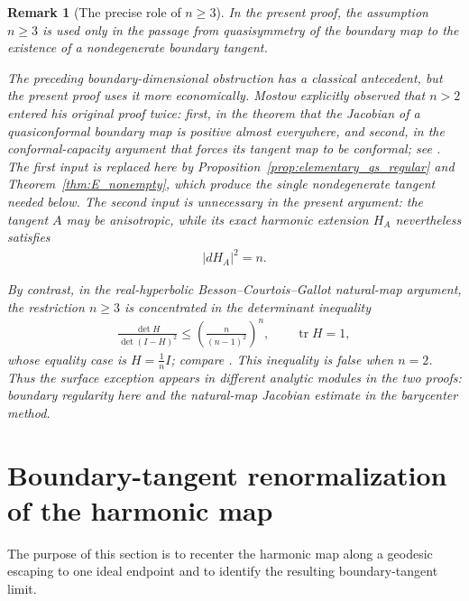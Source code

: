 \documentclass[11pt]{amsart}
\theoremstyle{plain}
\theoremstyle{plain}
\theoremstyle{plain}
\newtheorem{remark}[theorem]{Remark}
\numberwithin{equation}{section}
\begin{document}
\begin{remark}[The precise role of \(n\geq3\)]
In the present proof, the assumption \(n\geq3\) is used only in the
passage from quasisymmetry of the boundary map to the existence of a
nondegenerate boundary tangent.

The preceding boundary-dimensional obstruction has a classical
antecedent, but the present proof uses it more economically.  Mostow
explicitly observed that \(n>2\) entered his original proof twice:
first, in the theorem that the Jacobian of a quasiconformal boundary
map is positive almost everywhere, and second, in the
conformal-capacity argument that forces its tangent map to be
conformal; see
\cite[Theorem~9.4 and \S12, pp.~94, 99--102]{Mostow1968}.
The first input is replaced here by
Proposition~\ref{prop:elementary_qs_regular} and
Theorem~\ref{thm:E_nonempty}, which produce the single nondegenerate
tangent needed below.  The second input is unnecessary in the present
argument: the tangent \(A\) may be anisotropic, while its exact
harmonic extension \(H_A\) nevertheless satisfies
\begin{align}
|dH_A|^2=n.
\nonumber
\end{align}

By contrast, in the real-hyperbolic Besson--Courtois--Gallot
natural-map argument, the restriction \(n\geq3\) is concentrated in
the determinant inequality
\begin{align}
\frac{\det H}{\det(I-H)^2}
\leq
\left(\frac{n}{(n-1)^2}\right)^n,
\qquad
\operatorname{tr}H=1,
\nonumber
\end{align}
whose equality case is \(H=\frac1n I\); compare
\cite[pp.~637--639]{BessonCourtoisGallot}.  This inequality is false
when \(n=2\).  Thus the surface exception appears in different
analytic modules in the two proofs: boundary regularity here and the
natural-map Jacobian estimate in the barycenter method.
\end{remark}

\section{Boundary-tangent renormalization of the harmonic map}
\label{sec:tangent}

The purpose of this section is to recenter the harmonic map along a
geodesic escaping to one ideal endpoint and to identify the resulting
boundary-tangent limit.  
\end{document}

